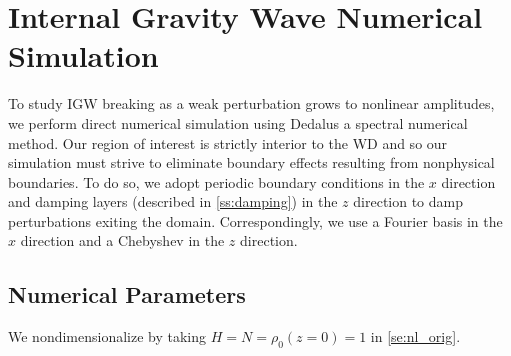 \documentclass[twocolumn,
        nofootinbib, %
        usenames, %
        aps,
        prd,
        dvipsnames %
    ]{revtex4-1}%
\begin{document}
\section{Internal Gravity Wave Numerical Simulation}\label{s:sim}

To study IGW breaking as a weak perturbation grows to nonlinear amplitudes, we
perform direct numerical simulation using Dedalus\cite{dedalus} a spectral
numerical method. Our region of interest is strictly interior to the WD and so
our simulation must strive to eliminate boundary effects resulting from
nonphysical boundaries. To do so, we adopt periodic boundary conditions in the
$x$ direction and damping layers (described in \autoref{ss:damping}) in the $z$
direction to damp perturbations exiting the domain. Correspondingly, we use a
Fourier basis in the $x$ direction and a Chebyshev in the $z$ direction.

\subsection{Numerical Parameters}\label{ss:numerics}

We nondimensionalize by taking $H = N = \rho_0(z=0) = 1$ in
\autoref{se:nl_orig}.

\end{document}

